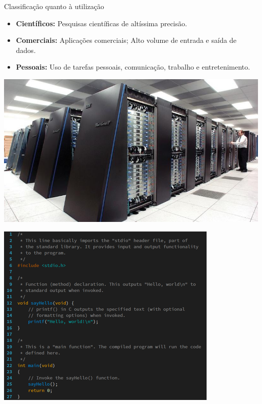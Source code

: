 \begin{frame}{Classificação quanto à utilização}
	\begin{block}{}
		\begin{itemize}
			\item \textbf{Científicos:} Pesquisas científicas de altíssima precisão.
			\item \textbf{Comerciais:} Aplicações comerciais; Alto volume de entrada e saída de dados.
			\item \textbf{Pessoais:} Uso de tarefas pessoais, comunicação, trabalho e entretenimento.
		\end{itemize}
	\end{block}

	\bigskip

	\begin{minipage}{0.49\linewidth}
		\centering
		\includegraphics[width=1\linewidth]{Figuras/Ch01/fig3}
	\end{minipage}\hfill
	\begin{minipage}{0.49\linewidth}
		\centering
		\includegraphics[width=0.9\linewidth]{Figuras/Ch01/fig4.1}
	\end{minipage}

\end{frame}



